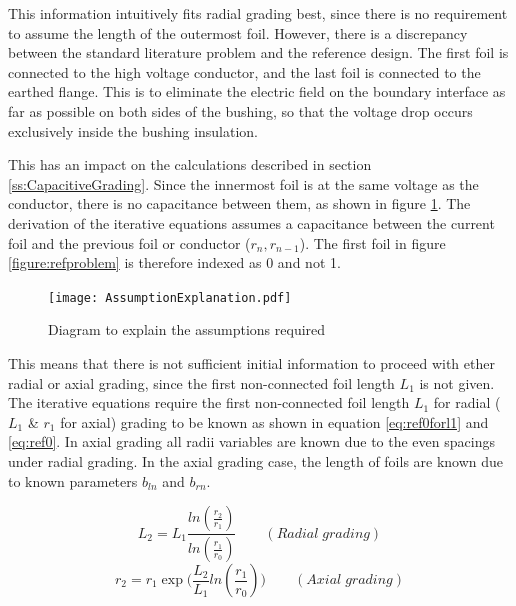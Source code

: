 This information intuitively fits radial grading best, since there is no requirement to assume the length of the outermost foil.
However, there is a discrepancy between the standard literature problem and the reference design.
The first foil is connected to the high voltage conductor, and the last foil is connected to the earthed flange.
This is to eliminate the electric field on the boundary interface as far as possible on both sides of the bushing, so that the voltage drop occurs exclusively inside the bushing insulation.

This has an impact on the calculations described in section \ref{ss:CapacitiveGrading}.
Since the innermost foil is at the same voltage as the conductor, there is no capacitance between them, as shown in figure \ref{figure:required assumptions}.
The derivation of the iterative equations assumes a capacitance between the current foil and the previous foil or conductor ($r_n,r_{n-1}$). 
The first foil in figure \ref{figure:refproblem} is therefore indexed as 0 and not 1.

\begin{figure}[!h]
   \centering
   \texttt{[image: AssumptionExplanation.pdf]}
   \caption{Diagram to explain the assumptions required}
   \label{figure:required assumptions}
\end{figure}

This means that there is not sufficient initial information to proceed with ether radial or axial grading, since the first non-connected foil length $L_1$ is not given.
The iterative equations require the first non-connected foil length $L_1$ for radial ( $L_1$ \& $r_1$ for axial) grading to be known as shown in equation \ref{eq:ref0forl1} and \ref{eq:ref0}. 
In axial grading all radii variables are known due to the even spacings under radial grading. In the axial grading  case, the length of foils are known due to known parameters $b_{ln}$ and $b_{rn}$.

\begin{equation}
   \label{eq:ref0forl1}
   L_{2} = L_{1}\displaystyle\frac{{ln(\displaystyle\frac{r_{2}}{r_{1}})} }{ln(\displaystyle\frac{r_{1}}{r_{0}})} \qquad (Radial \; grading)
\end{equation}
\begin{equation}
  \label{eq:ref0}
  \displaystyle r_2= \displaystyle  r_{1} \displaystyle \exp\big( \displaystyle  \frac{L_2}{L_{1}}ln(\displaystyle \frac{r_1}{r_0})\big) \qquad (Axial \; grading)
\end{equation}




